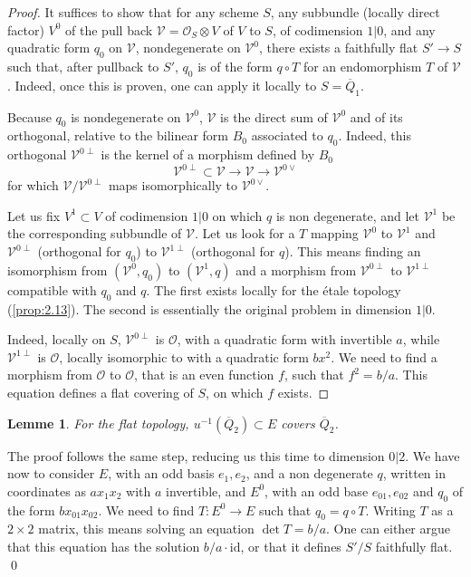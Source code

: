 \documentclass[11pt,a4paper]{article}
\theoremstyle{plain}
\newtheorem{lemma}[theorem]{Lemme}
\theoremstyle{definition}
\begin{document}
\begin{proof}
It suffices to show that for any scheme $S$, any subbundle (locally direct factor) $V^0$ of the pull back $\mathcal{V} = \mathcal{O}_S \otimes V$ of $V$ to $S$, of codimension $1|0$, and any quadratic form $q_0$ on $\mathcal{V}$, nondegenerate on $\mathcal{V}^0$, there exists a faithfully flat $S' \to S$ such that, after pullback to $S'$, $q_0$ is of the form $q \circ T$ for an endomorphism $T$ of $\mathcal{V}$. Indeed, once this is proven, one can apply it locally to $S = \overline{Q}_1$.

Because $q_0$ is nondegenerate on $\mathcal{V}^0$, $\mathcal{V}$ is the direct sum of $\mathcal{V}^0$ and of its orthogonal, relative to the bilinear form $B_0$ associated to $q_0$. Indeed, this orthogonal $\mathcal{V}^{0\perp}$ is the kernel of a morphism defined by $B_0$
\[
\mathcal{V}^{0\perp} \subset \mathcal{V} \to \mathcal{V} \to \mathcal{V}^{0\vee}
\]
for which $\mathcal{V}/\mathcal{V}^{0\perp}$ maps isomorphically to $\mathcal{V}^{0\vee}$.

Let us fix $V^1 \subset V$ of codimension $1|0$ on which $q$ is non degenerate, and let $\mathcal{V}^1$ be the corresponding subbundle of $\mathcal{V}$. Let us look for a $T$ mapping $\mathcal{V}^0$ to $\mathcal{V}^1$ and $\mathcal{V}^{0\perp}$ (orthogonal for $q_0$) to $\mathcal{V}^{1\perp}$ (orthogonal for $q$). This means finding an isomorphism from $(\mathcal{V}^0, q_0)$ to $(\mathcal{V}^1, q)$ and a morphism from $\mathcal{V}^{0\perp}$ to $\mathcal{V}^{1\perp}$ compatible with $q_0$ and $q$. The first exists locally for the \'etale topology (\ref{prop:2.13}). The second is essentially the original problem in dimension $1|0$.

Indeed, locally on $S$, $\mathcal{V}^{0\perp}$ is $\mathcal{O}$, with a quadratic form with invertible $a$, while $\mathcal{V}^{1\perp}$ is $\mathcal{O}$, locally isomorphic to with a quadratic form $bx^2$. We need to find a morphism from $\mathcal{O}$ to $\mathcal{O}$, that is an even function $f$, such that $f^2 = b/a$. This equation defines a flat covering of $S$, on which $f$ exists.
\end{proof}

\begin{lemma}\label{lem:3.10}
For the flat topology, $u^{-1}(\overline{Q}_2) \subset E$ covers $\overline{Q}_2$.
\end{lemma}

The proof follows the same step, reducing us this time to dimension $0|2$. We have now to consider $E$, with an odd basis $e_1, e_2$, and a non degenerate $q$, written in coordinates as $ax_1x_2$ with $a$ invertible, and $E^0$, with an odd base $e_{01}, e_{02}$ and $q_0$ of the form $bx_{01}x_{02}$. We need to find $T : E^0 \to E$ such that $q_0 = q \circ T$. Writing $T$ as a $2 \times 2$ matrix, this means solving an equation $\det T = b/a$. One can either argue that this equation has the solution $b/a \cdot \mathrm{id}$, or that it defines $S'/S$ faithfully flat.
\qed
\end{document}
